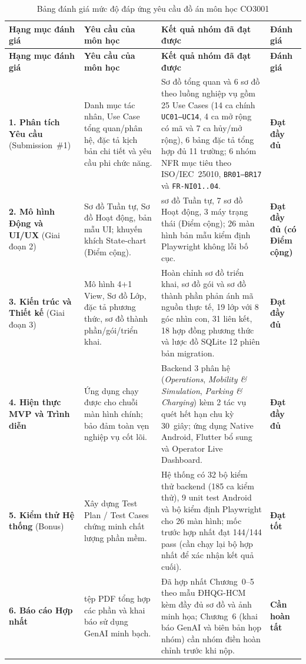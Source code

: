\begin{longtable}{>{\raggedright\arraybackslash}p{3.4cm} >{\raggedright\arraybackslash}p{3.9cm} >{\raggedright\arraybackslash}p{4.8cm} >{\centering\arraybackslash}p{2.1cm}}
\caption{Bảng đánh giá mức độ đáp ứng yêu cầu đồ án môn học CO3001} \label{tab:eval-criteria} \\
\toprule
\textbf{Hạng mục đánh giá} & \textbf{Yêu cầu của môn học} & \textbf{Kết quả nhóm đã đạt được} & \textbf{Đánh giá} \\
\midrule
\endfirsthead
\toprule
\textbf{Hạng mục đánh giá} & \textbf{Yêu cầu của môn học} & \textbf{Kết quả nhóm đã đạt được} & \textbf{Đánh giá} \\
\midrule
\endhead
\bottomrule
\endfoot
\textbf{1. Phân tích Yêu cầu} (Submission~\#1) & Danh mục tác nhân, Use Case tổng quan/phân hệ, đặc tả kịch bản chi tiết và yêu cầu phi chức năng. & Sơ đồ tổng quan và 6 sơ đồ theo luồng nghiệp vụ gồm 25 Use Cases (14 ca chính \texttt{UC01--UC14}, 4 ca mở rộng có mã và 7 ca hủy/mở rộng), 6 bảng đặc tả tổng hợp đủ 11 trường; 6 nhóm NFR mục tiêu theo ISO/IEC~25010, \texttt{BR01--BR17} và \texttt{FR-NI01..04}. & \textbf{Đạt đầy đủ} \\
\midrule
\textbf{2. Mô hình Động và UI/UX} (Giai đoạn 2) & Sơ đồ Tuần tự, Sơ đồ Hoạt động, bản mẫu UI; khuyến khích State-chart (Điểm cộng). & 7 sơ đồ Tuần tự, 7 sơ đồ Hoạt động, 3 máy trạng thái (Điểm cộng); 26 màn hình bản mẫu kiểm định Playwright không lỗi bố cục. & \textbf{Đạt đầy đủ (có Điểm cộng)} \\
\midrule
\textbf{3. Kiến trúc và Thiết kế} (Giai đoạn 3) & Mô hình 4+1 View, Sơ đồ Lớp, đặc tả phương thức, sơ đồ thành phần/gói/triển khai. & Hoàn chỉnh sơ đồ triển khai, sơ đồ gói và sơ đồ thành phần phản ánh mã nguồn thực tế, 19 lớp với 8 góc nhìn con, 31 liên kết, 18 hợp đồng phương thức và lược đồ SQLite 12 phiên bản migration. & \textbf{Đạt đầy đủ} \\
\midrule
\textbf{4. Hiện thực MVP và Trình diễn} & Ứng dụng chạy được cho chuỗi màn hình chính; bảo đảm toàn vẹn nghiệp vụ cốt lõi. & Backend 3 phân hệ (\textit{Operations}, \textit{Mobility \& Simulation}, \textit{Parking \& Charging}) kèm 2 tác vụ quét hết hạn chu kỳ 30~giây; ứng dụng Native Android, Flutter bổ sung và Operator Live Dashboard. & \textbf{Đạt đầy đủ} \\
\midrule
\textbf{5. Kiểm thử Hệ thống} (Bonus) & Xây dựng Test Plan / Test Cases chứng minh chất lượng phần mềm. & Hệ thống có 32 bộ kiểm thử backend (185 ca kiểm thử), 9 unit test Android và bộ kiểm định Playwright cho 26 màn hình; mốc trước hợp nhất đạt 144/144 pass (cần chạy lại bộ hợp nhất để xác nhận kết quả cuối). & \textbf{Đạt tốt} \\
\midrule
\textbf{6. Báo cáo Hợp nhất} & 1 tệp PDF tổng hợp các phần và khai báo sử dụng GenAI minh bạch. & Đã hợp nhất Chương~0--5 theo mẫu ĐHQG-HCM kèm đầy đủ sơ đồ và ảnh minh họa; Chương~6 (khai báo GenAI và biên bản họp nhóm) cần nhóm điền hoàn chỉnh trước khi nộp. & \textbf{Cần hoàn tất} \\
\bottomrule
\end{longtable}

